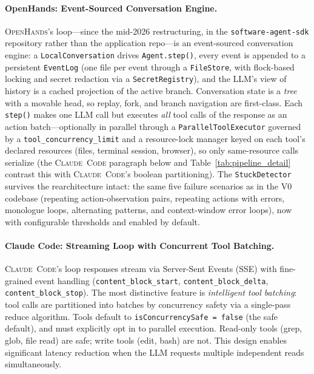 \documentclass[11pt,a4paper]{article}
\newcommand{\clcode}{\textsc{Claude~Code}\xspace}
\newcommand{\oh}{\textsc{OpenHands}\xspace}
\begin{document}
\paragraph{OpenHands: Event-Sourced Conversation Engine.}
\oh{}'s loop---since the mid-2026 restructuring, in the \texttt{software-agent-sdk} repository rather than the application repo---is an event-sourced conversation engine: a \texttt{LocalConversation} drives \texttt{Agent.step()}, every event is appended to a persistent \texttt{EventLog} (one file per event through a \texttt{FileStore}, with flock-based locking and secret redaction via a \texttt{SecretRegistry}), and the LLM's view of history is a cached projection of the active branch.
Conversation state is a \emph{tree} with a movable head, so replay, fork, and branch navigation are first-class.
Each \texttt{step()} makes one LLM call but executes \emph{all} tool calls of the response as an action batch---optionally in parallel through a \texttt{ParallelToolExecutor} governed by a \texttt{tool\_concurrency\_limit} and a resource-lock manager keyed on each tool's declared resources (files, terminal session, browser), so only same-resource calls serialize (the \clcode{} paragraph below and Table~\ref{tab:pipeline_detail} contrast this with \clcode{}'s boolean partitioning).
The \texttt{StuckDetector} survives the rearchitecture intact: the same five failure scenarios as in the V0 codebase (repeating action-observation pairs, repeating actions with errors, monologue loops, alternating patterns, and context-window error loops), now with configurable thresholds and enabled by default.

\paragraph{Claude Code: Streaming Loop with Concurrent Tool Batching.}
\clcode{}'s loop responses stream via Server-Sent Events (SSE) with fine-grained event handling (\texttt{content\_block\_start}, \texttt{content\_block\_delta}, \texttt{content\_block\_stop}).
The most distinctive feature is \emph{intelligent tool batching}: tool calls are partitioned into batches by concurrency safety via a single-pass reduce algorithm.
Tools default to \texttt{isConcurrencySafe = false} (the safe default), and must explicitly opt in to parallel execution.
Read-only tools (grep, glob, file read) are safe; write tools (edit, bash) are not.
This design enables significant latency reduction when the LLM requests multiple independent reads simultaneously.
\end{document}
